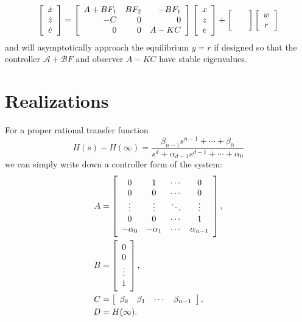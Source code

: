 \documentclass{report}
\begin{document}
$$
\left[\begin{array}{c}
  \dot{x} \\
  \dot{z} \\
  \dot{e}
\end{array}\right] =
\left[\begin{array}{r r r}
  A + B F_1 & B F_2 & -B F_1 \\
  -C        & 0     &  0     \\
   0        & 0     &  A - K C
\end{array}\right]
\left[\begin{array}{c}
  x \\
  z \\
  e
\end{array}\right]
+
\left[\begin{array}{c}
  \quad \\
  \quad
\end{array}\right]
\left[\begin{array}{c}
  w \\
  r
\end{array}\right]
$$
and will asymptotically approach the equilibrium $y = r$ if designed
so that the controller $\mathcal{A} + \mathcal{B} F$ and
observer $A - K C$ have stable eigenvalues.

\section{Realizations}
For a proper rational transfer function
$$
H(s) - H(\infty)
  = \frac{\beta_{n-1}s^{n-1} + \cdots + \beta_0}
         {s^d + \alpha_{d-1}s^{d-1} + \cdots + \alpha_0}
$$
we can simply write down a controller form of the system:
\begin{align*}
A &=
\left[\begin{array}{c c c c}
  0         & 1         & \cdots & 0      \\
  0         & 0         & \cdots & 0      \\
  \vdots    & \vdots    & \ddots & \vdots \\
  0         & 0         & \cdots & 1      \\
  -\alpha_0 & -\alpha_1 & \cdots & \alpha_{n-1}
\end{array}\right], \\
B &=
\left[\begin{array}{c}
0      \\
0      \\
\vdots \\
1
\end{array}\right], \\
C &=
\left[\begin{array}{c c c c}
  \beta_0 & \beta_1 & \cdots & \beta_{n-1}
\end{array}\right], \\
D &= H(\infty).
\end{align*}
\end{document}
